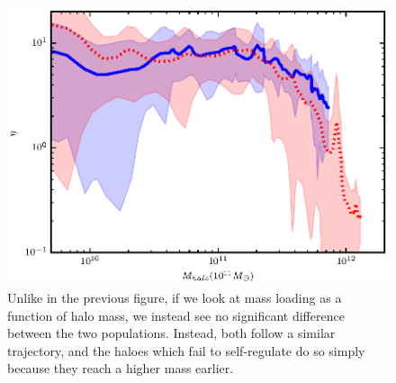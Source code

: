 \begin{figure}
    \includegraphics[width=\textwidth]{figures3/massloading_halo.eps}
    \caption[Mass loading as a function of halo mass in MUGS2]{Unlike in the
    previous figure, if we look at mass loading as a function of halo mass, we
    instead see no significant difference between the two populations.  Instead,
    both follow a similar trajectory, and the haloes which fail to self-regulate
    do so simply because they reach a higher mass earlier.}
    \label{massloading_halo}
\end{figure}

